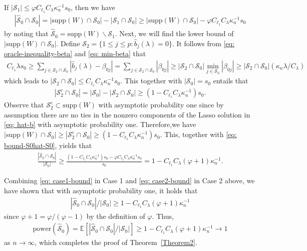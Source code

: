 \documentclass[11pt]{article}
\begin{document}
If $|\mathcal{S}_1|\leq \varphi C_{\ell_1}C_{\lambda}\kappa_n^{-1}s_0$, then we have
\begin{align}\label{eq: bound-S0hat-S0}
|\widehat{\mathcal{S}}_0 \cap \mathcal{S}_0|
=|\mbox{supp}(W) \cap \mathcal{S}_0|-	|\mathcal{S}_1 \cap \mathcal{S}_0|
\geq |\mbox{supp}(W) \cap \mathcal{S}_0|-	\varphi C_{\ell_1}C_{\lambda}\kappa_n^{-1}s_0
\end{align}
by noting that $\widehat{\mathcal{S}}_0=\mbox{supp}(W)\backslash\mathcal{S}_{1}$.  Next, we will find the lower bound of $|\mbox{supp}(W) \cap \mathcal{S}_0|$. Define $\mathcal{S}_2=\{1\leq j\leq p: \widehat{b}_j(\lambda)=0\}$. 
It follows from \eqref{eq: oracle-inequality-beta} and \eqref{eq: min-beta} that
\begin{align*}
C_{\ell_1}\lambda s_0
\geq \sum_{j\in \mathcal{S}_2\cap\mathcal{S}_0}|\widehat{b}_j(\lambda)-\beta_{0j}|
=\sum_{j\in \mathcal{S}_2\cap\mathcal{S}_0}|\beta_{0j}|
\geq |\mathcal{S}_2\cap\mathcal{S}_0|\min_{j\in\mathcal{S}_0}|\beta_{0j}|
\geq |\mathcal{S}_2\cap\mathcal{S}_0|(\kappa_n\lambda/C_{\lambda})
\end{align*}
which leads to $	|\mathcal{S}_2\cap\mathcal{S}_0|
\leq  C_{\ell_1}C_{\lambda}\kappa_n^{-1} s_0$.
This together with $|\mathcal{S}_0|=s_0$ entails that 
\begin{align*}
|\mathcal{S}_2^c \cap \mathcal{S}_0|
=	|\mathcal{S}_0|-|\mathcal{S}_2 \cap \mathcal{S}_0|
\geq  (1-C_{\ell_1}C_{\lambda}\kappa_n^{-1}) s_0. 
\end{align*}
Observe that $\mathcal{S}_2^c \subset\mbox{supp}(W)$ with asymptotic probability one since by assumption there are no ties in the nonzero components of the Lasso solution in \eqref{eq: hat-b} with asymptotic probability one. Therefore,we have $|\mbox{supp}(W)\cap \mathcal{S}_0|
\geq |\mathcal{S}_2^c \cap \mathcal{S}_0|
\geq  (1-C_{\ell_1}C_{\lambda}\kappa_n^{-1}) s_0$.
This, together with \eqref{eq: bound-S0hat-S0}, yields that
\begin{align}\label{eq: case2-bound}
\frac{|\widehat{\mathcal{S}}_0 \cap \mathcal{S}_0|}{|\mathcal{S}_0|}
\geq \frac{(1-C_{\ell_1}C_{\lambda}\kappa_n^{-1}) s_0-\varphi C_{\ell_1}C_{\lambda}\kappa_n^{-1}s_0}{s_0}
=1-C_{\ell_1}C_{\lambda}(\varphi+1)\kappa_n^{-1}.
\end{align}

Combining \eqref{eq: case1-bound} in Case 1 and \eqref{eq: case2-bound} in Case 2 above, we have shown that with
asymptotic probability one, it holds that
\begin{align*}
|\widehat{\mathcal{S}}_0 \cap \mathcal{S}_0|/|\mathcal{S}_0|
\geq 
1-C_{\ell_1}C_{\lambda}(\varphi+1)\kappa_n^{-1}
\end{align*}
since $\varphi+1=\varphi/(\varphi-1)$ by the definition of $\varphi$. Thus, 
\begin{align*}
\mathrm{power}(\widehat{\mathcal{S}}_0 )=\mathbb{E}\left[|\widehat{\mathcal{S}}_0 \cap \mathcal{S}_0|/|\mathcal{S}_0|\right]
\geq 
1-C_{\ell_1}C_{\lambda}(\varphi+1)\kappa_n^{-1}
\to 1
\end{align*}
as $n\to\infty$, which completes the proof of Theorem~\ref{Theorem2}. 
\end{document}
